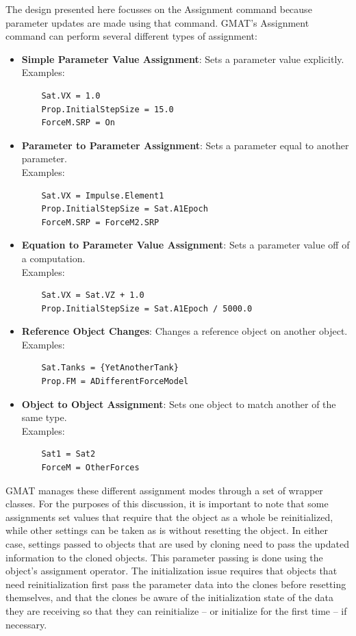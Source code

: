 \documentclass[10pt,letterpaper]{article}
\begin{document}
The design presented here focusses on the Assignment command because parameter updates are made using that command.  GMAT's Assignment command can perform several different types of assignment:
\begin{itemize}
\item \textbf{Simple Parameter Value Assignment}: Sets a parameter value explicitly.\\Examples:
\begin{verbatim}
    Sat.VX = 1.0
    Prop.InitialStepSize = 15.0
    ForceM.SRP = On
\end{verbatim}
\item \textbf{Parameter to Parameter Assignment}:  Sets a parameter equal to another parameter.  \\Examples:
\begin{verbatim}
    Sat.VX = Impulse.Element1
    Prop.InitialStepSize = Sat.A1Epoch
    ForceM.SRP = ForceM2.SRP
\end{verbatim}
\item \textbf{Equation to Parameter Value Assignment}:  Sets a parameter value off of a computation.  \\Examples:
\begin{verbatim}
    Sat.VX = Sat.VZ + 1.0
    Prop.InitialStepSize = Sat.A1Epoch / 5000.0
\end{verbatim}
\item \textbf{Reference Object Changes}:  Changes a reference object on another object. \\Examples:
\begin{verbatim}
    Sat.Tanks = {YetAnotherTank}
    Prop.FM = ADifferentForceModel
\end{verbatim}
\item \textbf{Object to Object Assignment}:  Sets one object to match another of the same type.  \\Examples:
\begin{verbatim}
    Sat1 = Sat2
    ForceM = OtherForces
\end{verbatim}
\end{itemize}
\noindent GMAT manages these different assignment modes through a set of wrapper classes.  For the purposes of this discussion, it is important to note that some assignments set values that require that the object as a whole be reinitialized, while other settings can be taken as is without resetting the object.  In either case, settings passed to objects that are used by cloning need to pass the updated information to the cloned objects.  This parameter passing is done using the object's assignment operator.  The initialization issue requires that objects that need reinitialization first pass the parameter data into the clones before resetting themselves, and that the clones be aware of the initialization state of the data they are receiving so that they can reinitialize -- or initialize for the first time -- if necessary.
\end{document}
